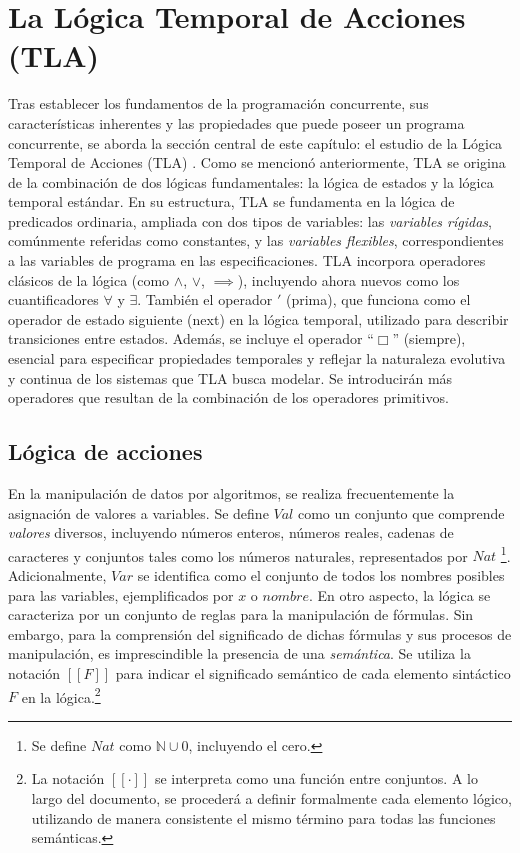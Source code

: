 \section{La Lógica Temporal de Acciones (TLA)}\label{section:TLA}
Tras establecer los fundamentos de la programación concurrente, sus características inherentes y las propiedades que puede poseer un programa concurrente, se aborda la sección central de este capítulo: el estudio de la Lógica Temporal de Acciones (TLA) \cite{lamport1994temporal}. Como se mencionó anteriormente, TLA se origina de la combinación de dos lógicas fundamentales: la lógica de estados y la lógica temporal estándar. En su estructura, TLA se fundamenta en la lógica de predicados ordinaria, ampliada con dos tipos de variables: las \textit{variables rígidas}, comúnmente referidas como constantes, y las \textit{variables flexibles}, correspondientes a las variables de programa en las especificaciones. TLA incorpora operadores clásicos de la lógica (como $\land$, $\lor$, $\implies$),  incluyendo ahora nuevos como los cuantificadores $\forall$ y $\exists$. También el operador $'$ (prima), que funciona como el operador de estado siguiente (next) en la lógica temporal, utilizado para describir transiciones entre estados. Además, se incluye el operador ``$\Box$'' (siempre), esencial para especificar propiedades temporales y reflejar la naturaleza evolutiva y continua de los sistemas que TLA busca modelar. Se introducirán más operadores que resultan de la combinación de los operadores primitivos.

\subsection{Lógica de acciones}\label{subsection:LActions}
En la manipulación de datos por algoritmos, se realiza frecuentemente la asignación de valores a variables. Se define $Val$ como un conjunto que comprende \textit{valores} diversos, incluyendo números enteros, números reales, cadenas de caracteres y conjuntos tales como los números naturales, representados por $Nat$ \footnote{Se define $Nat$ como $\mathbb{N} \cup {0}$, incluyendo el cero.}. Adicionalmente, $Var$ se identifica como el conjunto de todos los nombres posibles para las variables, ejemplificados por $x$ o $nombre$. En otro aspecto, la lógica se caracteriza por un conjunto de reglas para la manipulación de fórmulas. Sin embargo, para la comprensión del significado de dichas fórmulas y sus procesos de manipulación, es imprescindible la presencia de una \textit{semántica}. Se utiliza la notación $[[F]]$ para indicar el significado semántico de cada elemento sintáctico $F$ en la lógica.\footnote{La notación $[[\cdot]]$ se interpreta como una función entre conjuntos. A lo largo del documento, se procederá a definir formalmente cada elemento lógico, utilizando de manera consistente el mismo término para todas las funciones semánticas.}

